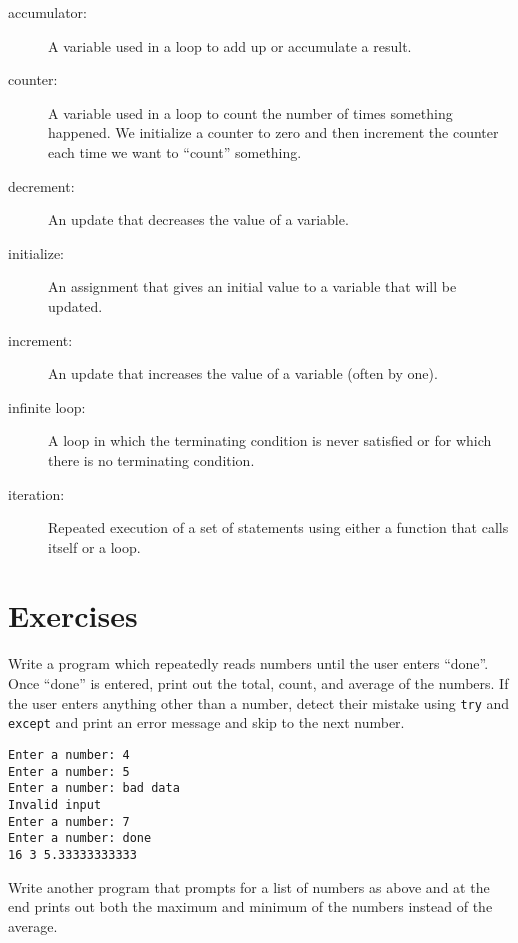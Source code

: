 \begin{description}

\item[accumulator:] A variable used in a loop to add up or
accumulate a result.

\item[counter:] A variable used in a loop to count the number
of times something happened.  We initialize a counter to 
zero and then increment the counter each time we want to
``count'' something.

\item[decrement:] An update that decreases the value of a variable.

\item[initialize:] An assignment that gives an initial value to
a variable that will be updated.

\item[increment:] An update that increases the value of a variable
(often by one).

\item[infinite loop:] A loop in which the terminating condition is
never satisfied or for which there is no terminating condition.

\item[iteration:] Repeated execution of a set of statements using
either a function that calls itself or a loop.

\end{description}


\section{Exercises}

\begin{ex}
Write a program which repeatedly reads numbers until the user
enters ``done''.
Once ``done'' is entered, print out the total, count, and average
of the numbers.  If the user enters anything other than a number, 
detect their mistake using {\tt try} and {\tt except} and 
print an error message and skip to the next number.

\begin{verbatim}
Enter a number: 4
Enter a number: 5
Enter a number: bad data
Invalid input
Enter a number: 7
Enter a number: done
16 3 5.33333333333
\end{verbatim}
\end{ex}

\begin{ex}
Write another program that prompts for a list of numbers as above
and at the end prints out both the maximum and minimum of the numbers instead of the average.
\end{ex}


